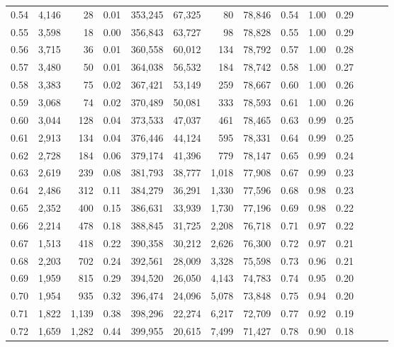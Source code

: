\begin{tabular}{rrrrrrrrrrrrrr}
0.54 &  4,146 &     28 &  0.01 &  353,245 &   67,325 &      80 &  78,846 &  0.54 &  1.00 &      0.29 \\
0.55 &  3,598 &     18 &  0.00 &  356,843 &   63,727 &      98 &  78,828 &  0.55 &  1.00 &      0.29 \\
0.56 &  3,715 &     36 &  0.01 &  360,558 &   60,012 &     134 &  78,792 &  0.57 &  1.00 &      0.28 \\
0.57 &  3,480 &     50 &  0.01 &  364,038 &   56,532 &     184 &  78,742 &  0.58 &  1.00 &      0.27 \\
0.58 &  3,383 &     75 &  0.02 &  367,421 &   53,149 &     259 &  78,667 &  0.60 &  1.00 &      0.26 \\
0.59 &  3,068 &     74 &  0.02 &  370,489 &   50,081 &     333 &  78,593 &  0.61 &  1.00 &      0.26 \\
0.60 &  3,044 &    128 &  0.04 &  373,533 &   47,037 &     461 &  78,465 &  0.63 &  0.99 &      0.25 \\
0.61 &  2,913 &    134 &  0.04 &  376,446 &   44,124 &     595 &  78,331 &  0.64 &  0.99 &      0.25 \\
0.62 &  2,728 &    184 &  0.06 &  379,174 &   41,396 &     779 &  78,147 &  0.65 &  0.99 &      0.24 \\
0.63 &  2,619 &    239 &  0.08 &  381,793 &   38,777 &   1,018 &  77,908 &  0.67 &  0.99 &      0.23 \\
0.64 &  2,486 &    312 &  0.11 &  384,279 &   36,291 &   1,330 &  77,596 &  0.68 &  0.98 &      0.23 \\
0.65 &  2,352 &    400 &  0.15 &  386,631 &   33,939 &   1,730 &  77,196 &  0.69 &  0.98 &      0.22 \\
0.66 &  2,214 &    478 &  0.18 &  388,845 &   31,725 &   2,208 &  76,718 &  0.71 &  0.97 &      0.22 \\
0.67 &  1,513 &    418 &  0.22 &  390,358 &   30,212 &   2,626 &  76,300 &  0.72 &  0.97 &      0.21 \\
0.68 &  2,203 &    702 &  0.24 &  392,561 &   28,009 &   3,328 &  75,598 &  0.73 &  0.96 &      0.21 \\
0.69 &  1,959 &    815 &  0.29 &  394,520 &   26,050 &   4,143 &  74,783 &  0.74 &  0.95 &      0.20 \\
0.70 &  1,954 &    935 &  0.32 &  396,474 &   24,096 &   5,078 &  73,848 &  0.75 &  0.94 &      0.20 \\
0.71 &  1,822 &  1,139 &  0.38 &  398,296 &   22,274 &   6,217 &  72,709 &  0.77 &  0.92 &      0.19 \\
0.72 &  1,659 &  1,282 &  0.44 &  399,955 &   20,615 &   7,499 &  71,427 &  0.78 &  0.90 &      0.18 \\

\end{tabular}
